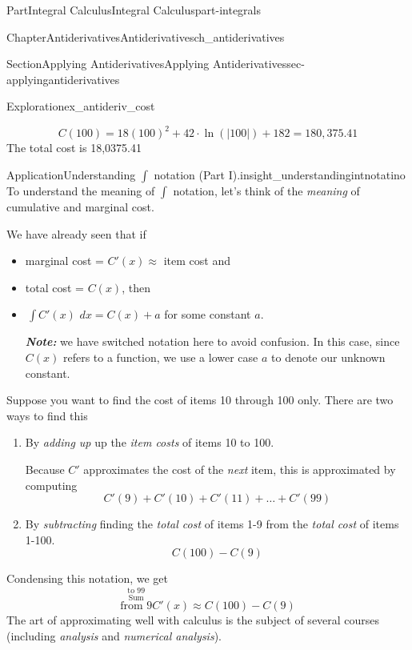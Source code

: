 \documentclass[oneside,10pt,]{tufte-book}
\newcommand{\alert}[1]{\textbf{\textit{#1}}}
\numberwithin{equation}{chapter}
\newcommand{\intdx}[1]{{\,\int#1\,\,dx}}
\begin{document}
\begin{partptx}{Part}{Integral Calculus}{}{Integral Calculus}{}{}{part-integrals}
\begin{chapterptx}{Chapter}{Antiderivatives}{}{Antiderivatives}{}{}{ch_antiderivatives}
\begin{sectionptx}{Section}{Applying Antiderivatives}{}{Applying Antiderivatives}{}{}{sec-applyingantiderivatives}
\begin{exploration}{Exploration}{}{ex_antideriv_cost}
\begin{enumerate}[font=\bfseries,label=(\alph*),ref=\alph*]
\begin{equation*}
C(100) = 18 (100)^2 + 42\cdot \ln(|100|) + 182 = 180,375.41
\end{equation*}
The total cost is \textdollar{}18,0375.41%
\end{enumerate}%
\end{exploration}%
\begin{insight}{Application}{Understanding \(\int\) notation (Part I).}{insight_understandingintnotatino}%
To understand the meaning of \(\int\) notation, let's think of the \emph{meaning} of cumulative and marginal cost.%
\par
We have already seen that if%
\begin{itemize}[label=\textbullet]
\item{}marginal cost = \(C'(x) \approx\) item cost and%
\item{}total cost = \(C(x)\), then%
\item{}\(\intdx{C'(x)} = C(x) + a\) for some constant \(a\).%
\par
\alert{Note:} we have switched notation here to avoid confusion. In this case, since \(C(x)\) refers to a function, we use a lower case \(a\) to denote our unknown constant.%
\end{itemize}
%
\par
Suppose you want to find the cost of items 10 through 100 only.  There are two ways to find this%
\begin{enumerate}
\item{}By \emph{adding up} up the \emph{item costs} of items 10 to 100.%
\par
Because \(C'\) approximates the cost of the \emph{next} item, this is approximated by computing%
\begin{equation*}
C'(9)+C'(10)+C'(11) + \dots + C'(99) 
\end{equation*}
%
\item{}By \emph{subtracting} finding the \emph{total cost} of items 1-9 from the \emph{total cost} of items 1-100.%
\begin{equation*}
C(100) - C(9)
\end{equation*}
%
\end{enumerate}
Condensing this notation, we get%
\begin{equation*}
\stackrel{ \scriptstyle \text{to 99} }{ \stackrel{\textstyle\text{Sum}}{ \scriptstyle \text{from 9} }  } C'(x)
\approx
C(100) - C(9)
\end{equation*}
The art of approximating well with calculus is the subject of several courses (including \emph{analysis} and \emph{numerical analysis}).%

\end{insight}
\end{sectionptx}
\end{chapterptx}
\end{partptx}
\end{document}
